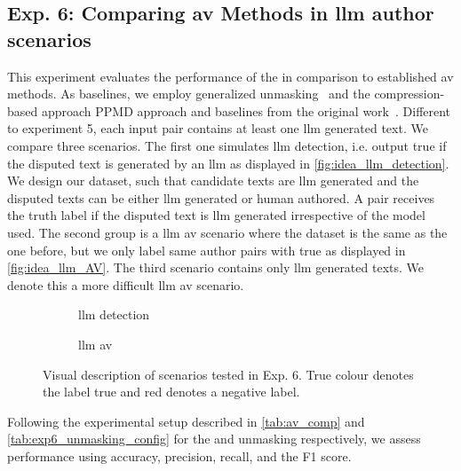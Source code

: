 \subsection{Exp. 6: Comparing \ac{av} Methods in \acs{llm} author scenarios}

This experiment evaluates the performance of the \impAppr{} in comparison to established \ac{av} methods.
As baselines, we employ generalized unmasking~\citep{bevendorff_generalizing_2019} and the compression-based approach PPMD approach and baselines from the original work~\citep{koppel_determining_2014}.
Different to experiment 5, each input pair contains at least one \ac{llm} generated text.
We compare three scenarios.
The first one simulates \ac{llm} detection, i.e. output true if the disputed text is generated by an \ac{llm} as displayed in \autoref{fig:idea_llm_detection}.
We design our dataset, such that candidate texts are \ac{llm} generated and the disputed texts can be either \ac{llm} generated or human authored.
A pair receives the truth label if the disputed text is \ac{llm} generated irrespective of the model used.
The second group is a \ac{llm} \ac{av} scenario where the dataset is the same as the one before, but we only label same author pairs with true as displayed in \autoref{fig:idea_llm_AV}.
The third scenario contains only \ac{llm} generated texts.
We denote this a more difficult \ac{llm} \ac{av} scenario.

\begin{figure}[htbp]
  \centering
  \begin{subfigure}{0.45\textwidth}
    \centering
    
    \caption{\ac{llm} detection}
    \label{fig:idea_llm_detection}
  \end{subfigure}
  \hfill
  \begin{subfigure}{0.45\textwidth}
    \centering
    
    \caption{\ac{llm} \ac{av}}
    \label{fig:idea_llm_AV}
  \end{subfigure}
  \caption{Visual description of scenarios tested in Exp. 6.
  True colour denotes the label true and red denotes a negative label.
  }
  \label{fig:ideas_exp6}
\end{figure}


Following the experimental setup described in \autoref{tab:av_comp} and \autoref{tab:exp6_unmasking_config} for the \impAppr{} and unmasking respectively, we assess performance using  accuracy, precision, recall, and the F1 score. 

